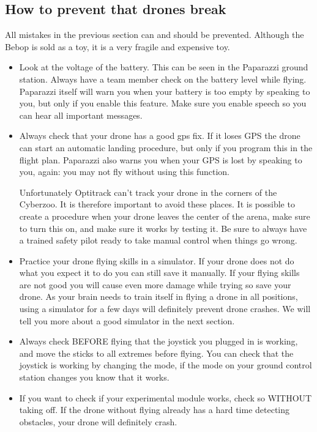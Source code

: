 \documentclass{article}
\begin{document}
\subsection*{How to prevent that drones break }
All mistakes in the previous section can and should be prevented. Although the Bebop is sold as a toy, it is a very fragile and expensive toy. 
\begin{itemize}
\item Look at the voltage of the battery. This can be seen in the Paparazzi ground station. Always have a team member check on the battery level while flying. Paparazzi itself will warn you when your battery is too empty by speaking to you, but only if you enable this feature. Make sure you enable speech so you can hear all important messages.

\item Always check that your drone has a good gps fix. If it loses GPS the drone can start an automatic landing procedure, but only if you program this in the flight plan. Paparazzi also warns you when your GPS is lost by speaking to you, again: you may not fly without using this function. 

Unfortunately Optitrack can't track your drone in the corners of the Cyberzoo. It is therefore important to avoid these places. It is possible to create a procedure when your drone leaves the center of the arena, make sure to turn this on, and make sure it works by testing it. Be sure to always have a trained safety pilot ready to take manual control when things go wrong. 

\item Practice your drone flying skills in a simulator. If your drone does not do what you expect it to do you can still save it manually. If your flying skills are not good you will cause even more damage while trying so save your drone. As your brain needs to train itself in flying a drone in all positions, using a simulator for a few days will definitely prevent drone crashes. We will tell you more about a good simulator in the next section. 

\item Always check BEFORE flying that the joystick you plugged in is working, and move the sticks to all extremes before flying. You can check that the joystick is working by changing the mode, if the mode on your ground control station changes you know that it works. 
\item If you want to check if your experimental module works, check so WITHOUT taking off. If the drone without flying already has a hard time detecting obstacles, your drone will definitely crash.
\end{itemize}
\end{document}
